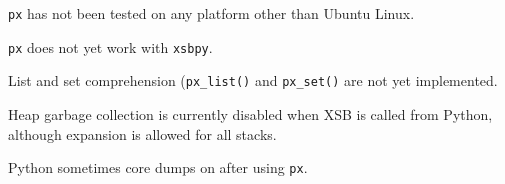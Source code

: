 \bi

\item {\tt px} has not been tested on any platform other than Ubuntu
  Linux.
\item {\tt px} does not yet work with {\tt xsbpy}.
\item List and set comprehension ({\tt px\_list()} and {\tt px\_set()}
  are not yet implemented.
\item Heap garbage collection is currently disabled when XSB is called
  from Python, although expansion is allowed for all stacks. 
\item Python sometimes core dumps on after using {\tt px}.
  
\ei  
